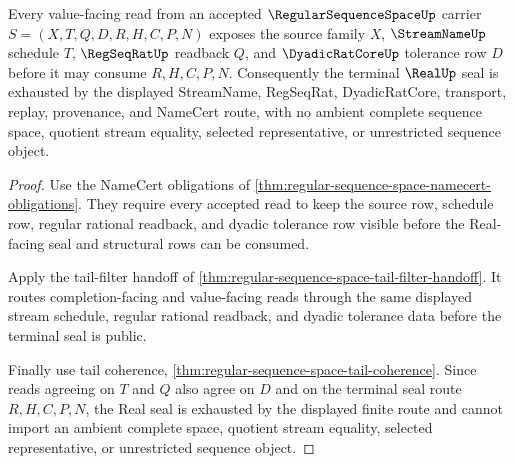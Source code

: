 \begin{theorem}
\label{thm:regular-sequence-space-value-seal-exhaustion}
Every value-facing read from an accepted $\RegularSequenceSpaceUp$ carrier $S=(X,T,Q,D,R,H,C,P,N)$ exposes the source family $X$, $\StreamNameUp$ schedule $T$, $\RegSeqRatUp$ readback $Q$, and $\DyadicRatCoreUp$ tolerance row $D$ before it may consume $R,H,C,P,N$. Consequently the terminal $\RealUp$ seal is exhausted by the displayed StreamName, RegSeqRat, DyadicRatCore, transport, replay, provenance, and NameCert route, with no ambient complete sequence space, quotient stream equality, selected representative, or unrestricted sequence object.
\end{theorem}
\begin{proof}
Use the NameCert obligations of \autoref{thm:regular-sequence-space-namecert-obligations}. They require every accepted read to keep the source row, schedule row, regular rational readback, and dyadic tolerance row visible before the Real-facing seal and structural rows can be consumed.

Apply the tail-filter handoff of \autoref{thm:regular-sequence-space-tail-filter-handoff}. It routes completion-facing and value-facing reads through the same displayed stream schedule, regular rational readback, and dyadic tolerance data before the terminal seal is public.

Finally use tail coherence, \autoref{thm:regular-sequence-space-tail-coherence}. Since reads agreeing on $T$ and $Q$ also agree on $D$ and on the terminal seal route $R,H,C,P,N$, the Real seal is exhausted by the displayed finite route and cannot import an ambient complete space, quotient stream equality, selected representative, or unrestricted sequence object.
\end{proof}

